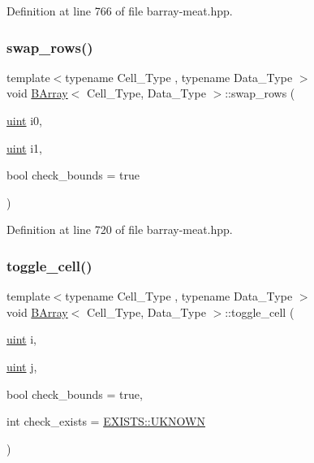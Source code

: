 Definition at line 766 of file barray-\/meat.\+hpp.

\mbox{\label{class_b_array_a742773803481c18e2865b2b2a1e68949}} 
\subsubsection{\texorpdfstring{swap\+\_\+rows()}{swap\_rows()}}
{\footnotesize\ttfamily template$<$typename Cell\+\_\+\+Type , typename Data\+\_\+\+Type $>$ \\
void \hyperlink{class_b_array}{B\+Array}$<$ Cell\+\_\+\+Type, Data\+\_\+\+Type $>$\+::swap\+\_\+rows (\begin{DoxyParamCaption}\item[{\hyperlink{typedefs_8hpp_a91ad9478d81a7aaf2593e8d9c3d06a14}{uint}}]{i0,  }\item[{\hyperlink{typedefs_8hpp_a91ad9478d81a7aaf2593e8d9c3d06a14}{uint}}]{i1,  }\item[{bool}]{check\+\_\+bounds = {\ttfamily true} }\end{DoxyParamCaption})\hspace{0.3cm}{\ttfamily [inline]}}



Definition at line 720 of file barray-\/meat.\+hpp.

\mbox{\label{class_b_array_a2ab2b200b329abc718cfb3574f566cf6}} 
\subsubsection{\texorpdfstring{toggle\+\_\+cell()}{toggle\_cell()}}
{\footnotesize\ttfamily template$<$typename Cell\+\_\+\+Type , typename Data\+\_\+\+Type $>$ \\
void \hyperlink{class_b_array}{B\+Array}$<$ Cell\+\_\+\+Type, Data\+\_\+\+Type $>$\+::toggle\+\_\+cell (\begin{DoxyParamCaption}\item[{\hyperlink{typedefs_8hpp_a91ad9478d81a7aaf2593e8d9c3d06a14}{uint}}]{i,  }\item[{\hyperlink{typedefs_8hpp_a91ad9478d81a7aaf2593e8d9c3d06a14}{uint}}]{j,  }\item[{bool}]{check\+\_\+bounds = {\ttfamily true},  }\item[{int}]{check\+\_\+exists = {\ttfamily \hyperlink{namespace_e_x_i_s_t_s_a81eb362d951445c658942a433afddb97}{E\+X\+I\+S\+T\+S\+::\+U\+K\+N\+O\+WN}} }\end{DoxyParamCaption})\hspace{0.3cm}{\ttfamily [inline]}}



